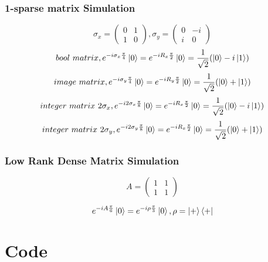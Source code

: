 \documentclass{article}
\begin{document}
\subsubsection{1-sparse matrix Simulation}
$$ \sigma_x =\left(\begin{matrix}
	0 & 1 \\
	1& 0
	\end{matrix}\right),
	\sigma_y = \left(\begin{matrix}
	0 & -i \\
	i & 0 
	\end{matrix}\right)
	$$
	$$ bool\  matrix, e^{-i\sigma_x \frac{\pi}{4} }\ket{0}=e^{-iR_x \frac{\pi}{2} }\ket{0} = \frac{1}{\sqrt{2}}(\ket{0}-i\ket{1}) $$
	$$ image \  matrix, e^{-i\sigma_y \frac{\pi}{4} }\ket{0}=e^{-iR_y \frac{\pi}{2} }\ket{0} = \frac{1}{\sqrt{2}}(\ket{0}+\ket{1}) $$	
	$$ integer\ matrix\  2\sigma_x, e^{-i2\sigma_x \frac{\pi}{8} }\ket{0}=e^{-iR_x \frac{\pi}{2} }\ket{0} = \frac{1}{\sqrt{2}}(\ket{0}-i\ket{1}) $$
	$$ integer\ matrix\  2\sigma_y, e^{-i2\sigma_y \frac{\pi}{8} }\ket{0}=e^{-iR_x \frac{\pi}{2} }\ket{0} = \frac{1}{\sqrt{2}}(\ket{0}+\ket{1}) $$
\subsubsection{Low Rank Dense Matrix Simulation}
$$ A=\begin{pmatrix}
1 &1 \\
1 & 1
\end{pmatrix}$$

$$ e^{-iA\frac{\pi}{6}}\ket{0} = e^{-i\rho\frac{\pi}{3}}\ket{0}, \rho = \ket{+}\bra{+}$$
\section{Code}
\end{document}
